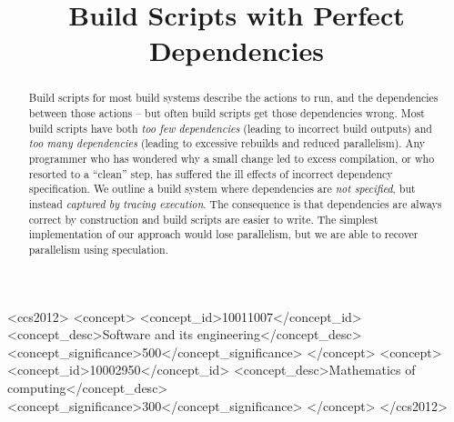 \documentclass[acmsmall,screen,review,anonymous,10pt]{acmart}
\begin{document}
\newcommand{\Make}{\textsc{Make}\xspace}
\newcommand{\Rattle}{\textsc{Rattle}\xspace}
\newcommand{\Fabricate}{\textsc{Fabricate}\xspace}
\newcommand{\Bazel}{\textsc{Bazel}\xspace}
\newcommand{\Buck}{\textsc{Buck}\xspace}
\newcommand{\Shake}{\textsc{Shake}\xspace}
\newcommand{\Bigbro}{\textsc{BigBro}\xspace}
\newcommand{\Fac}{\textsc{Fac}\xspace}
\newcommand{\Fsatrace}{\textsc{Fsatrace}\xspace}
\newcommand{\tracedfs}{\textsc{Traced-Fs}\xspace}
\newcommand{\BuildXL}{\textsc{BuildXL}\xspace}
\newcommand{\Nix}{\textsc{Nix}\xspace}
\newcommand{\Memoize}{\textsc{Memoize}\xspace}
\newcommand{\Stroll}{\textsc{Stroll}\xspace}

\newcommand{\postparagraphs}{\vspace{3mm}\noindent}


\title{Build Scripts with Perfect Dependencies}



\begin{abstract}
Build scripts for most build systems describe the actions to run, and the dependencies between those actions -- but often build scripts get those dependencies wrong.
Most build scripts have both \emph{too few dependencies} (leading to incorrect build outputs) and \emph{too many dependencies} (leading to excessive rebuilds and reduced parallelism). Any programmer who has wondered why a small change led to excess compilation, or who resorted to a ``clean'' step, has suffered the ill effects of incorrect dependency specification.
We outline a build system where dependencies are \emph{not specified}, but instead \emph{captured by tracing execution}.
The consequence is that dependencies are always correct by construction and build scripts are easier to write.
The simplest implementation of our approach would lose parallelism, but we are able to recover parallelism using speculation.
\end{abstract}

\begin{CCSXML}
<ccs2012>
<concept>
<concept_id>10011007</concept_id>
 <concept_desc>Software and its engineering</concept_desc>
<concept_significance>500</concept_significance>
</concept>
<concept>
<concept_id>10002950</concept_id>
 <concept_desc>Mathematics of computing</concept_desc>
<concept_significance>300</concept_significance>
</concept>
</ccs2012>
\end{CCSXML}

\maketitle










\end{document}
